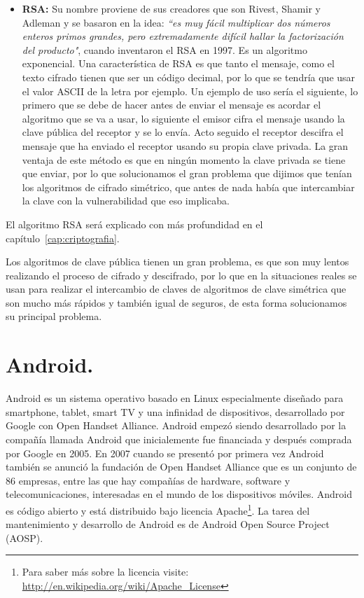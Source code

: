 \begin{itemize}

	\item \textbf{RSA:} Su nombre proviene de sus creadores que son Rivest, Shamir y Adleman y se basaron en la idea: \textit{``es muy fácil multiplicar dos números enteros primos grandes, pero extremadamente difícil hallar la factorización del producto"}, cuando inventaron el RSA en 1997. Es un algoritmo exponencial. Una característica de RSA es que tanto el mensaje, como el texto cifrado tienen que ser un código decimal, por lo que se tendría que usar el valor ASCII de la letra por ejemplo. Un ejemplo de uso sería el siguiente, lo primero que se debe de hacer antes de enviar el mensaje es acordar el algoritmo que se va a usar, lo siguiente el emisor cifra el mensaje usando la clave pública del receptor y se lo envía. Acto seguido el receptor descifra el mensaje que ha enviado el receptor usando su propia clave privada. La gran ventaja de este método es que en ningún momento la clave privada se tiene que enviar, por lo que solucionamos el gran problema que dijimos que tenían los algoritmos de cifrado simétrico, que antes de nada había que intercambiar la clave con la vulnerabilidad que eso implicaba. 

\end{itemize}

El algoritmo RSA será explicado con más profundidad en el capítulo~\ref{cap:criptografia}.

Los algoritmos de clave pública tienen un gran problema, es que son muy lentos realizando el proceso de cifrado y descifrado, por lo que en la situaciones reales se usan para realizar el intercambio de claves de algoritmos de clave simétrica que son mucho más rápidos y también igual de seguros, de esta forma solucionamos su principal problema.

\section{Android.}

Android es un sistema operativo basado en Linux especialmente diseñado para smartphone, tablet, smart TV y una infinidad de dispositivos, desarrollado por Google con Open Handset Alliance. Android empezó siendo desarrollado por la compañía llamada Android que inicialemente fue financiada y después comprada por Google en 2005. En 2007 cuando se presentó por primera vez Android también se anunció la fundación de Open Handset Alliance que es un conjunto de 86 empresas, entre las que hay compañías de hardware, software y telecomunicaciones, interesadas en el mundo de los dispositivos móviles. Android es código abierto y está distribuido bajo licencia Apache\footnote{ Para saber más sobre la licencia visite: \url{http://en.wikipedia.org/wiki/Apache\_License}}. La tarea del mantenimiento y desarrollo de Android es de Android Open Source Project (AOSP).

